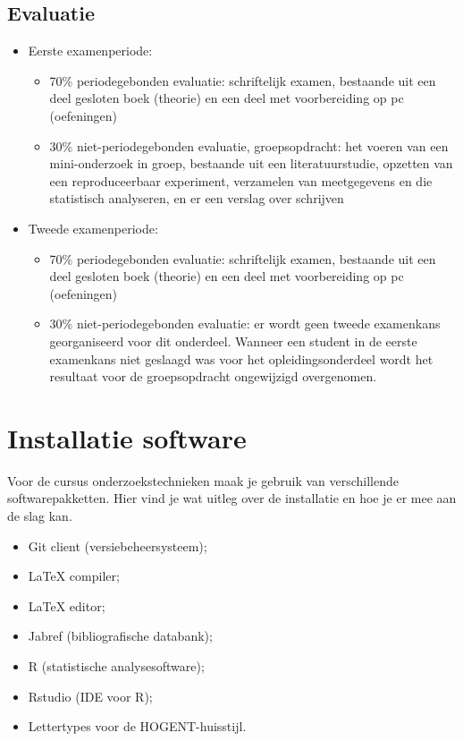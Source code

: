 \subsection{Evaluatie}

\begin{itemize}
  \item Eerste examenperiode:
  \begin{itemize}
    \item 70\% periodegebonden evaluatie: schriftelijk examen, bestaande uit een deel gesloten boek (theorie) en een deel met voorbereiding op pc (oefeningen)
    \item 30\% niet-periodegebonden evaluatie, groepsopdracht: het voeren van een mini-onder\-zoek in groep, bestaande uit een literatuurstudie, opzetten van een reproduceerbaar experiment, verzamelen van meetgegevens en die statistisch analyseren, en er een verslag over schrijven
  \end{itemize}
  \item Tweede examenperiode:
  \begin{itemize}
    \item 70\% periodegebonden evaluatie: schriftelijk examen, bestaande uit een deel gesloten boek (theorie) en een deel met voorbereiding op pc (oefeningen)
    \item 30\% niet-periodegebonden evaluatie: er wordt geen tweede examenkans georganiseerd voor dit onderdeel. Wanneer een student in de eerste examenkans niet geslaagd was voor het opleidingsonderdeel wordt het resultaat voor de groepsopdracht ongewijzigd overgenomen.
  \end{itemize}
\end{itemize}

\section{Installatie software}
\label{sec:installatie-software}

Voor de cursus onderzoekstechnieken maak je gebruik van verschillende softwarepakketten. Hier vind je wat uitleg over de installatie en hoe je er mee aan de slag kan.

\begin{itemize}
  \item Git client (versiebeheersysteem);
  \item \LaTeX{} compiler;
  \item \LaTeX{} editor;
  \item Jabref (bibliografische databank);
  \item R (statistische analysesoftware);
  \item Rstudio (IDE voor R);
  \item Lettertypes voor de HOGENT-huisstijl.
\end{itemize}

